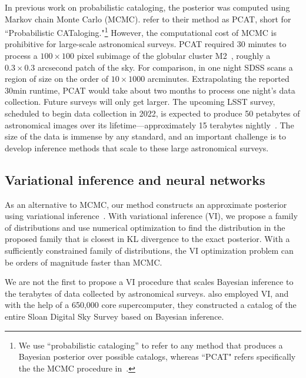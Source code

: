In previous work on probabilistic cataloging, the posterior was computed using Markov chain Monte Carlo (MCMC).
\cite{Portillo_2017, Feder_2019} refer to their method as PCAT, short for ``Probabilistic CATaloging."\footnote{
We use ``probabilistic cataloging'' to refer to any method that produces a Bayesian posterior over possible catalogs, whereas ``PCAT" refers specifically the the MCMC procedure in~\cite{Portillo_2017, Feder_2019}. }
However, the computational cost of MCMC is prohibitive for large-scale astronomical surveys. 
PCAT required 30 minutes to process a $100\times 100$ pixel subimage of the globular cluster M2~\cite{Feder_2019}, roughly a $0.3\times0.3$ arcsecond patch of the sky.
For comparison, in one night SDSS scans a region of size on the order of $10 \times 1000$ arcminutes. Extrapolating the reported 30min runtime, PCAT would take about two months to process one night's data collection.
Future surveys will only get larger. 
The upcoming LSST survey, scheduled to begin data collection in 2022, is expected to produce 50 petabytes of astronomical images over its lifetime---approximately 15 terabytes nightly~\cite{LSST_about}. 
The size of the data is immense by any standard, and an important challenge is to develop inference methods that scale to these large astronomical surveys. 

\subsection{Variational inference and neural networks}
As an alternative to MCMC, our method constructs an approximate posterior using variational inference~\cite{Blei_2017_vi_review,Jordan_intro_vi, Wainwrite_graph_models_vi}.
With variational inference (VI), we propose a family of distributions and use numerical optimization to find the distribution 
in the proposed family that is closest 
in KL divergence to the exact posterior. 
With a sufficiently constrained family of distributions, the VI optimization problem can be orders of magnitude faster than MCMC. 

We are not the first to propose a VI procedure
that scales Bayesian inference to the terabytes of data collected by astronomical surveys. 
\cite{regier2019_celeste} also employed 
VI, and with the help of a 650,000 core supercomputer, they constructed a catalog of the entire Sloan Digital Sky Survey based on Bayesian inference. 

